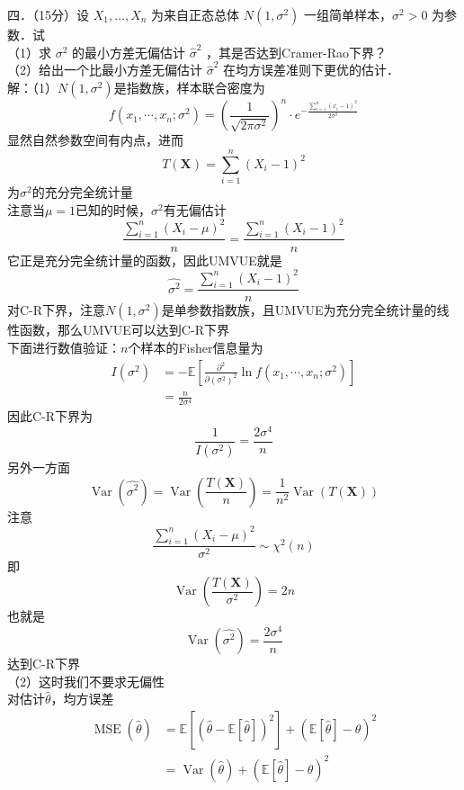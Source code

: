 \documentclass[UTF8,openany]{book}
\begin{document}
	
	\noindent 四．（15分）设 $X_1, \ldots, X_n$ 为来自正态总体 $N\left(1, \sigma^2\right)$ 一组简单样本，$\sigma^2>0$ 为参数．试\\
	（1）求 $\sigma^2$ 的最小方差无偏估计 $\hat{\sigma}^2$ ，其是否达到Cramer-Rao下界？\\
	（2）给出一个比最小方差无偏估计 $\hat{\sigma}^2$ 在均方误差准则下更优的估计．\\
	解：（1）$N\left(1, \sigma^2\right)$是指数族，样本联合密度为
	\[
	f\left(x_1, \cdots, x_n ; \sigma^2\right)=\left(\frac{1}{\sqrt{2 \pi \sigma^2}}\right)^n \cdot e^{-\frac{\sum\limits_{i=1}^n \left(x_{i}-1\right)^2}{2 \sigma^2}}
	\]
	显然自然参数空间有内点，进而
	\[
	T(\boldsymbol{X})=\sum\limits_{i=1}^n \left(X_{i}-1\right)^2
	\]
	为$\sigma^2$的充分完全统计量\\
	注意当$\mu=1$已知的时候，$\sigma^2$有无偏估计
	\[
	\frac{\sum\limits_{i=1}^n\left(X_i-\mu\right)^2}{n}=\frac{\sum\limits_{i=1}^n\left(X_i-1\right)^2}{n}
	\]
	它正是充分完全统计量的函数，因此UMVUE就是
	\[
	\hat{\sigma^2}=\frac{\sum\limits_{i=1}^n\left(X_i-1\right)^2}{n}
	\]
	对C-R下界，注意$N\left(1, \sigma^2\right)$是单参数指数族，且UMVUE为充分完全统计量的线性函数，那么UMVUE可以达到C-R下界\\
	下面进行数值验证：$n$个样本的Fisher信息量为
	\[
	\begin{aligned}
		I\left(\sigma^2\right) & =-\mathbb{E}\left[\frac{\partial^2}{\partial \left(\sigma^2\right)^2} \ln f\left(x_1, \cdots, x_n ; \sigma^2\right)\right] \\
		& =\frac{n}{2 \sigma^4} 
	\end{aligned}
	\]
	因此C-R下界为
	\[
	\frac{1}{I\left(\sigma^2\right)}=\frac{2 \sigma^4}{n} 
	\]
	另外一方面
	\[
	\operatorname{Var}\left(\hat{\sigma^2}\right)=\operatorname{Var}\left(\frac{T(\boldsymbol{X})}{n}\right)=\frac{1}{n^2} \operatorname{Var}(T(\boldsymbol{X}))
	\]
	注意
	\[
	\frac{\sum\limits_{i=1}^n\left(X_i-\mu\right)^2}{\sigma^2} \sim \chi^2(n)
	\]
	即
	\[
	\operatorname{Var}\left(\frac{T(\boldsymbol{X})}{\sigma^2}\right)=2n
	\]
	也就是
	\[
	\operatorname{Var}\left(\hat{\sigma^2}\right)=\frac{2 \sigma^4}{n} 
	\]
	达到C-R下界\\
	（2）这时我们不要求无偏性\\
	对估计$\hat{\theta}$，均方误差
	\[
	\begin{aligned}
		\operatorname{MSE}(\hat{\theta}) & =\mathbb{E}\left[(\hat{\theta}-\mathbb{E}[\hat{\theta}])^2\right]+(\mathbb{E}[\hat{\theta}]-\theta)^2 \\
		& =\operatorname{Var}(\hat{\theta})+(\mathbb{E}[\hat{\theta}]-\theta)^2
	\end{aligned}
	\]
\end{document}
